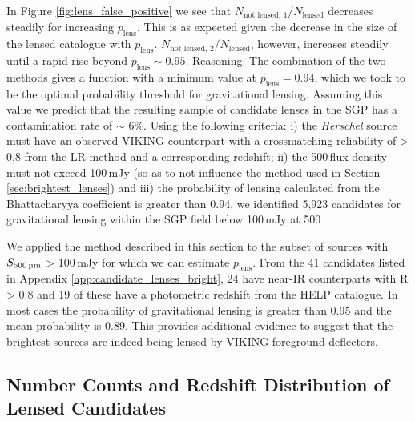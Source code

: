 In Figure \ref{fig:lens_false_positive} we see that $N_{\textrm{not lensed, 1}}/N_{\textrm{lensed}}$ decreases steadily for increasing $p_{\textrm{lens}}$. This is as expected given the decrease in the size of the lensed catalogue with $p_{\textrm{lens}}$. $N_{\textrm{not lensed, 2}}/N_{\textrm{lensed}}$, however, increases steadily until a rapid rise beyond $p_\textrm{lens} \sim 0.95$. {\color{red} Reasoning.} The combination of the two methods gives a function with a minimum value at $p_\textrm{lens} = 0.94$, which we took to be the optimal probability threshold for gravitational lensing. Assuming this value we predict that the resulting sample of candidate lenses in the SGP has a contamination rate of $\sim$ 6\%. Using the following criteria: i) the \textit{Herschel} source must have an observed VIKING counterpart with a crossmatching reliability of > 0.8 from the LR method and a corresponding redshift; ii) the 500\,\micron flux density must not exceed 100\,mJy (so as to not influence the method used in Section \ref{sec:brightest_lenses}) and iii) the probability of lensing calculated from the Bhattacharyya coefficient is greater than 0.94, we identified 5,923 candidates for gravitational lensing within the SGP field below 100\,mJy at 500\,\micron.

We applied the method described in this section to the subset of sources with $S_{\textrm{500\,\micron}}$ > 100\,mJy for which we can estimate $p_\textrm{lens}$. From the 41 candidates listed in Appendix \ref{app:candidate_lenses_bright}, 24 have near-IR counterparts with R > 0.8 and 19 of these have a photometric redshift from the HELP catalogue. In most cases the probability of gravitational lensing is greater than 0.95 and the mean probability is 0.89. This provides additional evidence to suggest that the brightest sources are indeed being lensed by VIKING foreground deflectors.

\subsection{Number Counts and Redshift Distribution of Lensed Candidates}

